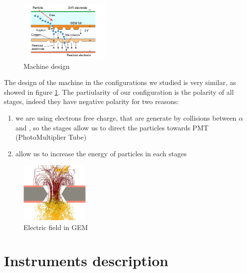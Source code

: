 \documentclass[a4paper,twoside,openany]{book}
\begin{document}
\begin{figure}[H]
\centering
\includegraphics[width=0.4\textwidth, height=0.3\textwidth]{GEM}
\caption{Machine design}
\label{schema}
\end{figure}

The design of the machine in the configurations we studied is very similar, as showed in figure \ref{schema}. The partiularity of our configuration is the polarity of all stages, indeed they  have negative polarity for two reasons:
\begin{enumerate}
\item we are using electrons free charge, that are generate by collisions between $\alpha$ and , so the stages allow us to direct the particles towards PMT (PhotoMultiplier Tube)
\item allow us to increase the energy of particles in each stages
\end{enumerate}

\begin{figure}[H]
\centering
\includegraphics[width=0.3\textwidth]{GEM8}
\caption{Electric field in GEM}
\end{figure}

\newpage
\null
\thispagestyle{empty}
\newpage

\setcounter{page}{1}
\tableofcontents

\newpage
\null
\thispagestyle{empty}
\newpage

\setcounter{page}{1}
\chapter{Instruments description}
\end{document}
